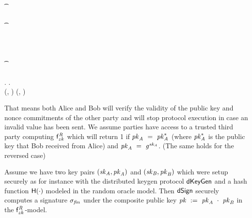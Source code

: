 \begin{center}
{\begin{varwidth}{\textwidth}
{        \t \color{blue} \pcreturn \cnstFalsum \\
        \pcif \procVerfPtSig{\varSigBob}{\varMsg}{\varPubKeyBob}  \< \< \\
        \t \pcreturn \cnstFalsum \< \< \\
        \varSigAlice \opFunResult \procSignPrt{\varMsg}{\varSecKeyAlice}{\varNonceAlice}{\varSigContext} \< \< \\
        \< \sendmessageright*{\varSigAlice} \< \\
        \< \< \pcif \procVerfPtSig{\varSigAlice}{\varMsg}{\varPubKeyAlice}  \\
        \< \< \t \pcreturn \cnstFalsum \\
        \varSigFin \opFunResult \procFinSig{\varSigAlice}{\varSigBob} \< \< \varSigFin \opFunResult \procFinSig{\varSigAlice}{\varSigBob} \\
        \varPubKey \opFunResult \varSigContext.\varPubKey \< \< \varPubKey \opFunResult \varSigContext.\varPubKey \\
        \pcreturn (\varSigFin, \varPubKey) \< \< \pcreturn (\varSigFin, \varPubKey)
        }
    \end{varwidth}
    }
\end{center}

That means both Alice and Bob will verify the validity of the public key and nonce commitments of the other party and will stop protocol execution in case an invalid value has been sent.
We assume parties have access to a trusted third party computing $\mathsf{f}^{\mathit{R}}_{zk}$ which will return 1 if $\mathit{pk}_{\mathit{A}} ~=~ \mathit{pk}_{\mathit{A}}^*$ (where $\mathit{pk}_{\mathit{A}}^*$ is the public key that Bob received from Alice) and $\mathit{pk}_{\mathit{A}} ~=~ \mathit{g}^{\mathit{sk}_{\mathit{A}}}$. (The same holds for the reversed case)

\begin{theorem}\label{lem:sig:security}
Assume we have two key pairs $(\mathit{sk}_{\mathit{A}}, \mathit{pk}_{\mathit{A}})$ and $(\mathit{sk}_{\mathit{B}}, \mathit{pk}_{\mathit{B}})$ which were setup securely as for instance with the distributed keygen protocol $\mathsf{dKeyGen}$ and a hash function $\mathsf{H} (\cdot)$ modeled in the random oracle model.
    Then $\mathsf{dSign}$ securely computes a signature $\sigma_{\mathit{fin}}$ under the composite public key $\mathit{pk} ~:=~ \mathit{pk}_{\mathit{A}} ~\cdot~ \mathit{pk}_{\mathit{B}}$ in the $\mathsf{f}^{\mathit{R}}_{zk}$-model.
\end{theorem}

